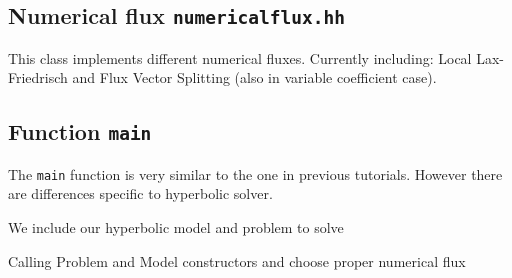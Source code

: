\documentclass[a4paper,12pt]{article}
\theoremstyle{definition}
\theoremstyle{definition}
\begin{document}














\subsection{Numerical flux \lstinline{numericalflux.hh}}

This class implements different numerical fluxes. Currently including: Local Lax-Friedrisch and  Flux Vector Splitting (also in variable coefficient case).





\subsection{Function \lstinline{main}}

The \lstinline{main} function is very similar to the one in previous tutorials. However there are differences specific to hyperbolic solver.



We include our hyperbolic model and problem to solve



Calling Problem and Model constructors and choose proper numerical flux

\end{document}
